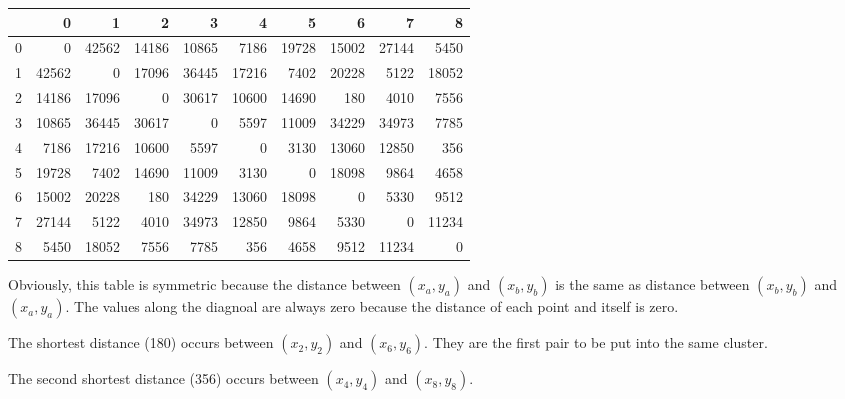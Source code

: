   \hspace{0.1in}
  \begin{tt}
\begin{tabular}{|r|rrrrrrrrr|}  \hline
& 0 & 1 & 2 & 3 & 4 & 5 & 6 & 7 & 8 \\ \hline

  0 &0 & 42562 & 14186 & 10865 & 7186 & 19728 & 15002 & 27144 & 5450\\

1 &42562 & 0 & 17096 & 36445 & 17216 & 7402 & 20228 & 5122 & 18052\\

2 &14186 & 17096 & 0 & 30617 & 10600 & 14690 & 180 & 4010 & 7556\\

3 &10865 & 36445 & 30617 & 0 & 5597 & 11009 & 34229 & 34973 & 7785\\

4 &7186 & 17216 & 10600 & 5597 & 0 & 3130 & 13060 & 12850 & 356\\

5 &19728 & 7402 & 14690 & 11009 & 3130 & 0 & 18098 & 9864 & 4658\\

6 &15002 & 20228 & 180 & 34229 & 13060 & 18098 & 0 & 5330 & 9512\\

7 &27144 & 5122 & 4010 & 34973 & 12850 & 9864 & 5330 & 0 & 11234\\

8 &5450 & 18052 & 7556 & 7785 & 356 & 4658 & 9512 & 11234 &
0 \\ \hline
\end{tabular}
\end{tt}
\hspace{0.1in}

Obviously, this table is symmetric because the distance between $(x_a,
y_a)$ and $(x_b, y_b)$ is the same as distance between $(x_b, y_b)$
and $(x_a, y_a)$. The values along the diagnoal are always zero
because the distance of each point and itself is zero.

The shortest distance (180) occurs between $(x_2, y_2)$ and $(x_6,
y_6)$.  They are the first pair to be put into the same cluster.



The second
shortest distance (356) occurs between $(x_4, y_4)$ and
$(x_8, y_8)$.




